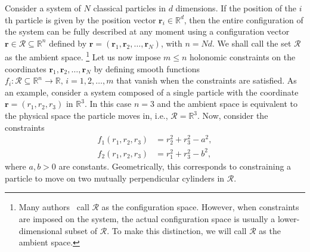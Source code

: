 Consider a system of $N$ classical particles in $d$ dimensions.  If the position of the $i$th particle is given by the position vector $\bm{r}_{i} \in \mathbb{R}^{d}$, then the entire configuration of the system can be fully described at any moment using a configuration vector $\bm{r} \in \mathscr{R} \subseteq \mathbb{R}^{n}$ defined by $\bm{r} = (\bm{r}_{1}, \bm{r}_{2}, \ldots, \bm{r}_{N})$, with $n = Nd$.
  We shall call the set $\mathscr{R}$ as the ambient space.%
  \footnote{Many authors~\cite{littlejohn1997,lelievre2010} call $\mathscr{R}$ as the configuration space.  However, when constraints are imposed on the system, the actual configuration space is usually a lower-dimensional subset of $\mathscr{R}$.  To make this distinction, we will call $\mathscr{R}$ as the ambient space.}
Let us now impose $m \leq n$ holonomic constraints on the coordinates $\bm{r}_1, \bm{r}_2, \dots, \bm{r}_N$ by defining smooth functions $f_i: \mathscr{R} \subseteq \mathbb{R}^n \to \mathbb{R},\, i=1, 2, \dots, m$ that vanish when the constraints are satisfied.
As an example, consider a system composed of a single particle with the coordinate $\bm{r} = (r_{1}, r_{2}, r_{3})$ in $\mathbb{R}^3$.
In this case $n=3$ and the ambient space is equivalent to the physical space the particle moves in, i.e., $\mathscr{R} = \mathbb{R}^3$.
Now, consider the constraints
%
\begin{equation}
  \begin{aligned}
    f_1(r_{1}, r_{2}, r_{3}) &= r_{2}^{2} + r_{3}^{2} - a^{2},\\
    f_2(r_{1}, r_{2}, r_{3}) &= r_{1}^{2} + r_{3}^{2} - b^{2},
  \end{aligned}
  \label{eq:cylcyl}
\end{equation}
%
where $a, b > 0$ are constants.
Geometrically, this corresponds to constraining a particle to move on two mutually perpendicular cylinders in $\mathscr{R}$.

